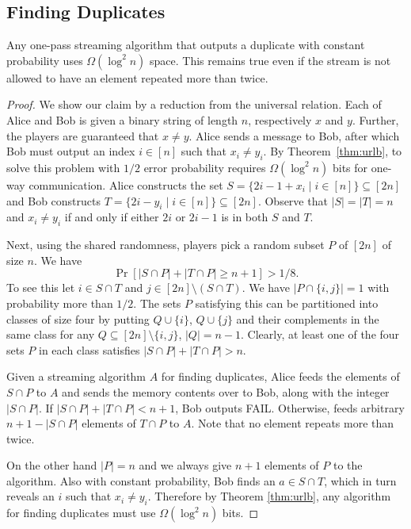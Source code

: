 \subsection{Finding Duplicates}\label{sec:dublb}
\begin{theorem}\label{thm:duplb}
Any one-pass streaming algorithm that outputs a duplicate with constant
probability  uses $\Omega(\log^2 n)$ space. This remains true even if the
stream is not allowed to have an element repeated more than twice. 
\end{theorem}
\begin{proof}
We show our claim by a reduction from the universal relation. Each of
 Alice and Bob is given a binary string of length $n$, respectively $x$ 
and $y$. Further, the players are guaranteed that $x\neq y$. Alice 
sends a message to Bob, after which Bob must output an index 
$i\in[n]$ such that $x_i\neq y_i$. By Theorem~\ref{thm:urlb}, to solve this 
problem with $1/2$ error probability requires $\Omega(\log^2 n)$ bits for one-way communication. 
Alice constructs the set $S=\{2i-1+x_i\mid i\in[n]\}\subseteq[2n]$ and Bob
constructs $T=\{2i-y_i\mid i\in[n]\}\subseteq[2n]$. Observe that $|S|=|T|=n$ 
and $x_i\neq y_i$ if and only if either $2i$ or $2i-1$ is in both $S$ and
$T$.

Next, using the shared randomness, players pick a random subset 
$P$ of $[2n]$ of size $n$. We have
$$\Pr[|S\cap P| + |T\cap P|\geq n+1]>1/8.$$
To see this let $i\in S\cap T$ and $j\in[2n]\setminus(S\cap T)$. We have
$|P\cap\{i,j\}|=1$ with probability more than $1/2$. The sets $P$ satisfying
this can be partitioned into classes of size four by putting $Q\cup\{i\}$,
$Q\cup\{j\}$ and their complements in the same class for any
$Q\subseteq[2n]\setminus\{i,j\}$, $|Q|=n-1$. Clearly, at least one of the four
sets $P$ in each class satisfies $|S\cap P|+|T\cap P|>n$.

Given a streaming 
algorithm $A$ for finding duplicates, Alice feeds the elements of 
$S\cap P$ to $A$ and sends the memory contents over to Bob, 
along with the integer $|S\cap P|$. If $|S\cap P|+|T\cap P|<n+1$, 
Bob outputs FAIL. Otherwise, feeds arbitrary $n+1-|S\cap P|$ 
elements of $T\cap P$ to $A$. Note that no element repeats more than twice.

On the other hand $|P|=n$ and we always give $n+1$ elements of $P$ 
to the algorithm. Also with constant probability, Bob finds an 
$a\in S \cap T$, which in turn reveals an $i$ such that $x_i\neq y_i$. 
Therefore by Theorem \ref{thm:urlb}, any algorithm for finding 
duplicates must use $\Omega(\log^2 n)$ bits.
\end{proof}

